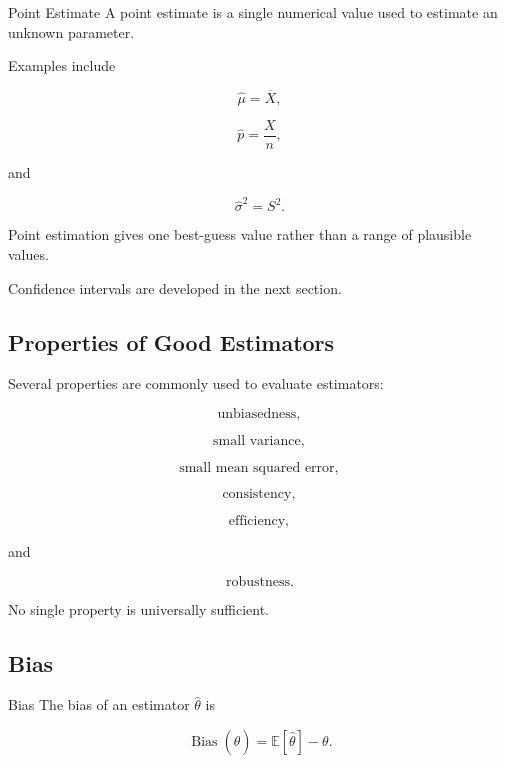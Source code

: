 \begin{definitionbox}{Point Estimate}
A point estimate is a single numerical value used to estimate an unknown
parameter.
\end{definitionbox}

Examples include

\[
\boxed{
\widehat{\mu}
=
\overline{X},
}
\]

\[
\boxed{
\widehat{p}
=
\frac{X}{n},
}
\]

and

\[
\boxed{
\widehat{\sigma}^2
=
S^2.
}
\]

Point estimation gives one best-guess value rather than a range of
plausible values.

Confidence intervals are developed in the next section.

\subsection{Properties of Good Estimators}
\label{subsec:properties-good-estimators}

Several properties are commonly used to evaluate estimators:

\[
\boxed{
\text{unbiasedness},
}
\]

\[
\boxed{
\text{small variance},
}
\]

\[
\boxed{
\text{small mean squared error},
}
\]

\[
\boxed{
\text{consistency},
}
\]

\[
\boxed{
\text{efficiency},
}
\]

and

\[
\boxed{
\text{robustness}.
}
\]

No single property is universally sufficient.

\subsection{Bias}
\label{subsec:bias-estimation}

\begin{definitionbox}{Bias}
The bias of an estimator \(\widehat{\theta}\) is

\[
\boxed{
\operatorname{Bias}(\widehat{\theta})
=
\mathbb{E}[\widehat{\theta}]
-
\theta.
}
\]
\end{definitionbox}

